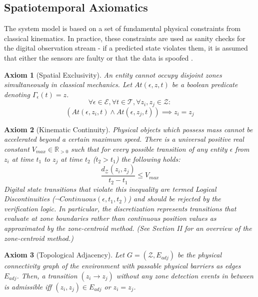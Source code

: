 \documentclass[conference]{IEEEtran}
\newtheorem{axiom}{Axiom}
\newcommand{\E}{\mathcal{E}} %
\newcommand{\Z}{\mathcal{Z}} %
\newcommand{\T}{\mathcal{T}} %
\newcommand{\Tr}{\Gamma} %
\begin{document}
\subsection{Spatiotemporal Axiomatics}
The system model is based on a set of fundamental physical constraints from classical kinematics. In practice, these constraints are used as sanity checks for the digital observation stream - if a predicted state violates them, it is assumed that either the sensors are faulty or that the data is spoofed \cite{b18}.

\begin{axiom}[Spatial Exclusivity]
An entity cannot occupy disjoint zones simultaneously in classical mechanics. Let $At(\epsilon, z, t)$ be a boolean predicate denoting $\Tr_\epsilon(t) = z$.
\begin{equation}
\forall \epsilon \in \E, \forall t \in \T, \forall z_i, z_j \in \Z: 
\end{equation}
\begin{equation*}
(At(\epsilon, z_i, t) \land At(\epsilon, z_j, t)) \implies z_i = z_j
\end{equation*}
\end{axiom}

\begin{axiom}[Kinematic Continuity]
Physical objects which possess mass cannot be accelerated beyond a certain maximum speed. There is a universal positive real constant $V_{max} \in \mathbb{R}_{>0}$ such that for every possible transition of any entity $\epsilon$ from $z_i$ at time $t_1$ to $z_j$ at time $t_2$ ($t_2 > t_1$) the following holds:
\begin{equation}
\frac{d_\Z(z_i, z_j)}{t_2 - t_1} \le V_{max}
\end{equation}
Digital state transitions that violate this inequality are termed Logical Discontinuities ($\neg Continuous(\epsilon, t_1, t_2)$) and should be rejected by the verification logic. In particular, the discretization represents transitions that evaluate at zone boundaries rather than continuous position values as approximated by the zone-centroid method. (See Section II for an overview of the zone-centroid method.)
\end{axiom}

\begin{axiom}[Topological Adjacency]
Let $G = (\Z, E_{adj})$ be the physical connectivity graph of the environment with passable physical barriers as edges $E_{adj}$. Then, a transition $(z_i \to z_j)$ without any zone detection events in between is admissible iff $(z_i, z_j) \in E_{adj}$ or $z_i = z_j$.
\end{axiom}
\end{document}
